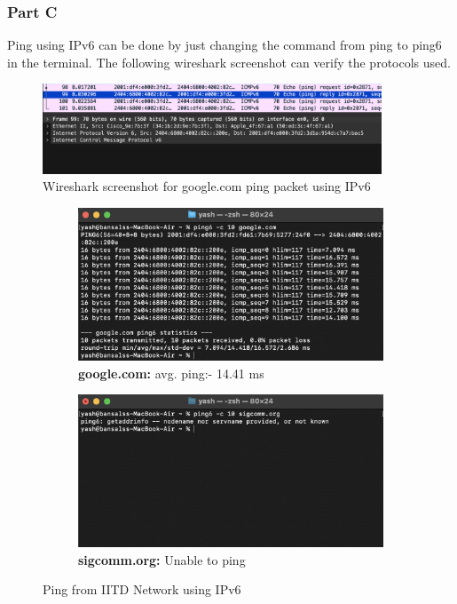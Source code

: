 \documentclass{article}
\begin{document}
\subsubsection{Part C}
Ping using IPv6 can be done by just changing the command from ping to ping6 in the terminal. The following wireshark screenshot can verify the protocols used.
        \begin{figure}[ht]
        \centering
        \includegraphics[width=0.9\textwidth]{ping6_wireshark.png}
        \caption*{Wireshark screenshot for google.com ping packet using IPv6}
        \end{figure}

\begin{figure}[H]
    \centering
    \begin{subfigure}[b]{0.48\textwidth}
        \centering
        \includegraphics[width=\textwidth]{ping_google_iitd_ipv6.png}
        \caption*{\textbf{google.com:} avg. ping:- 14.41 ms}
    \end{subfigure}
    \hfill
    \begin{subfigure}[b]{0.48\textwidth}
        \centering
        \includegraphics[width=\textwidth]{ping_sigcomm_iitd_ipv6.png}
        \caption*{\textbf{sigcomm.org:} Unable to ping}
    \end{subfigure}
    \caption*{Ping from IITD Network using IPv6}
\end{figure}
\end{document}

